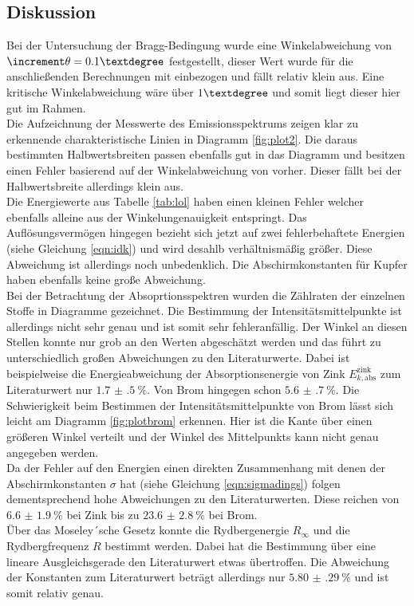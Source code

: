 \subsection{Diskussion}

Bei der Untersuchung der Bragg-Bedingung wurde eine Winkelabweichung von $\increment \theta = 0.1\textdegree$ festgestellt, dieser Wert
wurde für die anschließenden Berechnungen mit einbezogen und fällt relativ klein aus. Eine kritische Winkelabweichung wäre über $1\textdegree$ und somit liegt
dieser hier gut im Rahmen.
\\
\newline
Die Aufzeichnung der Messwerte des Emissionsspektrums zeigen klar zu erkennende charakteristische Linien in Diagramm \ref{fig:plot2}. Die daraus bestimmten Halbwertsbreiten
passen ebenfalls gut in das Diagramm und besitzen einen Fehler basierend auf der Winkelabweichung von vorher. Dieser fällt bei der Halbwertsbreite allerdings klein aus.
\\
\newline
Die Energiewerte aus Tabelle \ref{tab:lol} haben einen kleinen Fehler welcher ebenfalls alleine aus der Winkelungenauigkeit entspringt. Das Auflösungsvermögen
hingegen bezieht sich jetzt auf zwei fehlerbehaftete Energien (siehe Gleichung \ref{eqn:idk}) und wird desahlb verhältnismäßig größer. Diese Abweichung ist allerdings
noch unbedenklich. Die Abschirmkonstanten für Kupfer haben ebenfalls keine große Abweichung.
\\
\newline
Bei der Betrachtung der Absoprtionsspektren wurden die Zählraten der einzelnen Stoffe in Diagramme gezeichnet. Die Bestimmung der Intensitätsmittelpunkte
ist allerdings nicht sehr genau und ist somit sehr fehleranfällig. Der Winkel an diesen Stellen konnte nur grob an den Werten abgeschätzt werden und das führt zu unterschiedlich
großen Abweichungen zu den Literaturwerte. Dabei ist beispielweise die Energieabweichung der Absorptionsenergie von Zink $E_{k,\text{abs}}^{\text{zink}}$ zum Literaturwert nur $\SI{1.7(5)}{\percent}$. Von
Brom hingegen schon $\SI{5.6(7)}{\percent}$. Die Schwierigkeit beim Bestimmen der Intensitätsmittelpunkte von Brom lässt sich leicht am Diagramm \ref{fig:plotbrom} erkennen. Hier ist die Kante über einen größeren Winkel verteilt
und der Winkel des Mittelpunkts kann nicht genau angegeben werden.
\\
\newline
Da der Fehler auf den Energien einen direkten Zusammenhang mit denen der Abschirmkonstanten $\sigma$ hat (siehe Gleichung \ref{eqn:sigmadings}) folgen dementsprechend hohe Abweichungen zu den Literaturwerten.
Diese reichen von $\SI{6.6(19)}{\percent}$ bei Zink bis zu $\SI{23.6(28)}{\percent}$ bei Brom.
\\
\newline
Über das Moseley´sche Gesetz konnte die Rydbergenergie $R_{\infty}$ und die Rydbergfrequenz $R$ bestimmt werden. Dabei hat die Bestimmung über eine
lineare Ausgleichsgerade den Literaturwert etwas übertroffen. Die Abweichung der Konstanten zum Literaturwert beträgt allerdings nur $\SI{5.80(29)}{\percent}$ und ist somit relativ genau.


